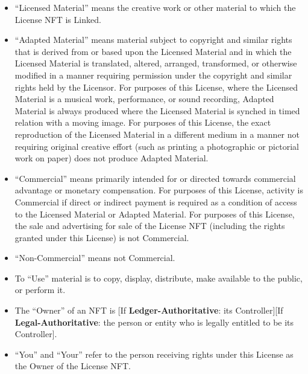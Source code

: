 \documentclass{article}
\newcommand{\keyword}[1]{\textbf{#1}\xspace}
\newcommand{\ledger}{\keyword{Ledger-Authoritative}}
\newcommand{\legal}{\keyword{Legal-Authoritative}}
\newcommand{\subsect}[1]{\vspace{12pt}\noindent{\em{#1}}}
\begin{document}
\begin{sffamily}
\begin{itemize}
	\item	``Licensed Material'' means the creative work or other material to which the License NFT is Linked.

	\item ``Adapted Material'' means material subject to copyright and similar rights that is derived from or based upon the Licensed Material and in which the Licensed Material is translated, altered, arranged, transformed, or otherwise modified in a manner requiring permission under the copyright and similar rights held by the Licensor. For purposes of this License, where the Licensed Material is a musical work, performance, or sound recording, Adapted Material is always produced where the Licensed Material is synched in timed relation with a moving image. For purposes of this License, the exact reproduction of the Licensed Material in a different medium in a manner not requiring original creative effort (such as printing a photographic or pictorial work on paper) does not produce Adapted Material.

	\item	``Commercial'' means primarily intended for or directed towards commercial advantage or monetary compensation. For purposes of this License, activity is Commercial if direct or indirect payment is required as a condition of access to the Licensed Material or Adapted Material. For purposes of this License, the sale and advertising for sale of the License NFT (including the rights granted under this License) is not Commercial.

	\item	``Non-Commercial'' means not Commercial.

	\item	To ``Use'' material is to copy, display, distribute, make available to the public, or perform it.

	\end{itemize}

	\subsect{Ownership and Transfers}

	\begin{itemize}
	
	\item	 The ``Owner'' of an NFT is [If \ledger: its Controller][If \legal: the person or entity who is legally entitled to be its Controller].
		
	\item	``You'' and ``Your'' refer to the person receiving rights under this License as the Owner of the License NFT.


\end{itemize}
\end{sffamily}
\end{document}
